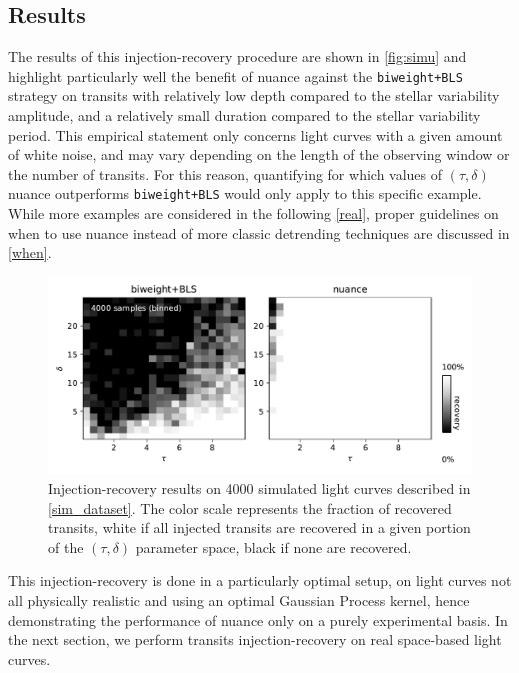 \documentclass{aastex631}
\newcommand{\wtls}{\texttt{biweight+BLS}}
\begin{document}
\subsection{Results}
The results of this injection-recovery procedure are shown in \autoref{fig:simu} and highlight particularly well the benefit of \textsf{nuance} against the \wtls{} strategy on transits with relatively low depth compared to the stellar variability amplitude, and a relatively small duration compared to the stellar variability period. This empirical statement only concerns light curves with a given amount of white noise, and may vary depending on the length of the observing window or the number of transits. For this reason, quantifying for which values of $(\tau, \delta)$ \textsf{nuance} outperforms \wtls{} would only apply to this specific example. While more examples are considered in the following \autoref{real}, proper guidelines on when to use \textsf{nuance} instead of more classic detrending techniques are discussed in \autoref{when}.
\begin{figure}[H]
    \begin{centering}
        \includegraphics[width=0.85\linewidth]{../workflows/synthetic-injection-recovery/figures/synthetic_ir.pdf}
        \caption{Injection-recovery results on 4000 simulated light curves described in \autoref{sim_dataset}. The color scale represents the fraction of recovered transits, white if all injected transits are recovered in a given portion of the $(\tau, \delta)$ parameter space, black if none are recovered.}
        \label{fig:simu}
    \end{centering}
\end{figure}

\noindent This injection-recovery is done in a particularly optimal setup, on light curves not all physically realistic and using an optimal Gaussian Process kernel, hence demonstrating the performance of \textsf{nuance} only on a purely experimental basis. In the next section, we perform transits injection-recovery on real space-based light curves.
\end{document}
